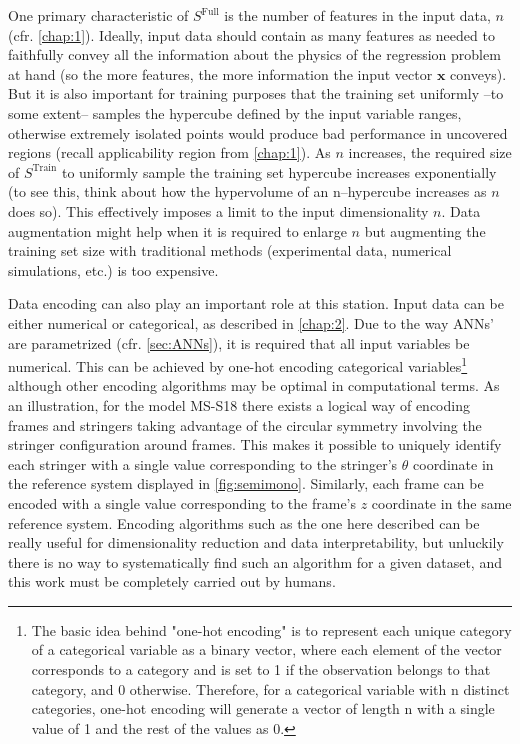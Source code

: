 One primary characteristic of $S^\text{Full}$ is the number of features in the input data, $n$ (cfr. \autoref{chap:1}). Ideally, input data should contain as many features as needed to faithfully convey all the information about the physics of the regression problem at hand (so the more features, the more information the input vector $\mathbf{x}$ conveys). But it is also important for training purposes that the training set uniformly --to some extent-- samples the hypercube defined by the input variable ranges, otherwise extremely isolated points would produce bad performance in uncovered regions (recall applicability region from \autoref{chap:1}). As $n$ increases, the required size of $S^\text{Train}$ to uniformly sample the training set hypercube increases exponentially (to see this, think about how the hypervolume of an n--hypercube increases as $n$ does so). This effectively imposes a limit to the input dimensionality $n$. Data augmentation might help when it is required to enlarge $n$ but augmenting the training set size with traditional methods (experimental data, numerical simulations, etc.) is too expensive.

Data encoding can also play an important role at this station. Input data can be either numerical or categorical, as described in \autoref{chap:2}. Due to  the way ANNs' are parametrized (cfr. \autoref{sec:ANNs}), it is required that all input variables be numerical. This can be achieved by one-hot encoding categorical variables\footnote{The basic idea behind "one-hot encoding" is to represent each unique category of a categorical variable as a binary vector, where each element of the vector corresponds to a category and is set to 1 if the observation belongs to that category, and 0 otherwise. Therefore, for a categorical variable with n distinct categories, one-hot encoding will generate a vector of length n with a single value of 1 and the rest of the values as 0.} although other encoding algorithms may be optimal in computational terms. As an illustration, for the model MS-S18 there exists a logical way of encoding frames and stringers taking advantage of the circular symmetry involving the stringer configuration around frames. This makes it possible to uniquely identify each stringer with a single value corresponding to the stringer's $\theta$ coordinate in the reference system displayed in \autoref{fig:semimono}. Similarly, each frame can be encoded with a single value corresponding to the frame's $z$ coordinate in the same reference system. Encoding algorithms such as the one here described can be really useful for dimensionality reduction and data interpretability, but unluckily there is no way to systematically find such an algorithm for a given dataset, and this work must be completely carried out by humans.

